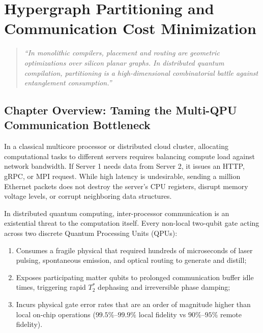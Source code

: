 \chapter{Hypergraph Partitioning and Communication Cost Minimization}
\label{ch:hypergraph_partitioning}

\begin{quote}
\textit{``In monolithic compilers, placement and routing are geometric optimizations over silicon planar graphs. In distributed quantum compilation, partitioning is a high-dimensional combinatorial battle against entanglement consumption.''}
\end{quote}

\section*{Chapter Overview: Taming the Multi-QPU Communication Bottleneck}

In a classical multicore processor or distributed cloud cluster, allocating computational tasks to different servers requires balancing compute load against network bandwidth. If Server 1 needs data from Server 2, it issues an HTTP, gRPC, or MPI request. While high latency is undesirable, sending a million Ethernet packets does not destroy the server's CPU registers, disrupt memory voltage levels, or corrupt neighboring data structures.

In distributed quantum computing, inter-processor communication is an existential threat to the computation itself. Every non-local two-qubit gate acting across two discrete Quantum Processing Units (QPUs):
\begin{enumerate}
    \item Consumes a fragile physical  that required hundreds of microseconds of laser pulsing, spontaneous emission, and optical routing to generate and distill;
    \item Exposes participating matter qubits to prolonged communication buffer idle times, triggering rapid $T_2^*$ dephasing and irreversible phase damping;
    \item Incurs physical gate error rates that are an order of magnitude higher than local on-chip operations ($99.5\%\text{--}99.9\%$ local fidelity vs $90\%\text{--}95\%$ remote fidelity).
\end{enumerate}

